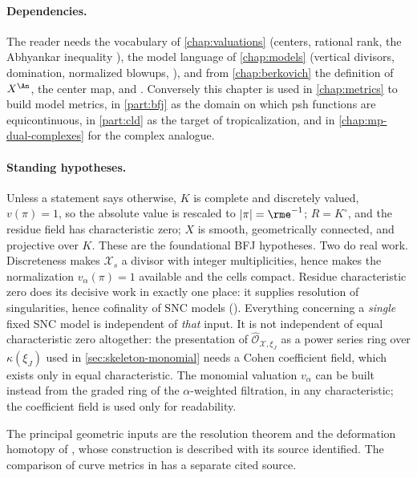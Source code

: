 \paragraph{Dependencies.}
The reader needs the vocabulary of \cref{chap:valuations} (centers, rational
rank, the Abhyankar inequality ), the model
language of \cref{chap:models} (vertical divisors, domination, normalized
blowups, ), and from \cref{chap:berkovich} the
definition of $X^{\An}$, the center map, and
. Conversely this chapter is used in
\cref{chap:metrics} to build model metrics, in \cref{part:bfj} as the domain
on which psh functions are equicontinuous, in \cref{part:cld} as the target
of tropicalization, and in \cref{chap:mp-dual-complexes} for the complex
analogue.

\paragraph{Standing hypotheses.}
Unless a statement says otherwise, $K$ is complete and discretely valued,
$v(\pi)=1$, so the absolute value is rescaled to $|\pi|=\rme^{-1}$;
$R=K^\circ$, and the residue field has characteristic zero;
$X$ is smooth, geometrically connected, and projective over $K$. These are the
foundational BFJ hypotheses. Two do real work. Discreteness makes
$\mathcal X_s$ a divisor with integer multiplicities, hence makes the
normalization $v_\alpha(\pi)=1$ available and the cells compact. Residue
characteristic zero does its decisive work in exactly one place: it supplies
resolution of singularities, hence cofinality of SNC models
(). Everything concerning a \emph{single} fixed SNC
model is independent of \emph{that} input.  It is not independent of equal
characteristic zero altogether: the presentation of
$\widehat{\mathcal O}_{\mathcal X,\xi_J}$ as a power series ring over
$\kappa(\xi_J)$ used in \cref{sec:skeleton-monomial} needs a Cohen
coefficient field, which exists only in equal characteristic.  The
monomial valuation $v_\alpha$ can be built instead from the graded ring of
the $\alpha$-weighted filtration, in any characteristic; the coefficient
field is used only for readability.

The principal geometric inputs are the resolution theorem
 and the deformation homotopy of
, whose construction is described with
its source identified.  The comparison of curve metrics in
 has a separate cited source.

